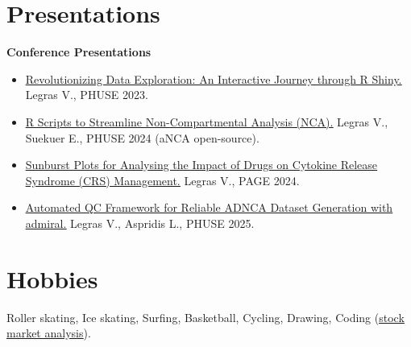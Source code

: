 \documentclass[10pt,a4paper]{article}
\newcommand{\link}[2]{\href{#1}{\textcolor{linkblue}{\uline{#2}}}}
\newcommand{\skillhead}[1]{\vspace{3pt}\noindent\textbf{\color{accent}#1}\par\vspace{1pt}}
\begin{document}
\section{Presentations}
{\sloppy
\skillhead{Conference Presentations}
\begin{itemize}
  \item \link{https://phuse.s3.eu-central-1.amazonaws.com/Archive/2023/Connect/EU/Birmingham/PRE_DV02.pdf}{Revolutionizing
        Data Exploration: An Interactive Journey through R Shiny.} Legras V.,
        PHUSE 2023.
  \item \link{https://phuse.s3.eu-central-1.amazonaws.com/Archive/2024/Connect/EU/Strasbourg/PRE_SM06.pdf}{R
        Scripts to Streamline Non-Compartmental Analysis (NCA).} Legras V.,
        Suekuer E., PHUSE 2024 (aNCA open-source).
  \item \link{https://www.page-meeting.org/wp-content/uploads/pdf_assets/11030-abstract.pdf}{Sunburst
        Plots for Analysing the Impact of Drugs on Cytokine Release Syndrome
        (CRS) Management.} Legras V., PAGE 2024.
  \item \link{https://phuse.s3.eu-central-1.amazonaws.com/Archive/2025/Connect/EU/Hamburg/PRE_SM05.pdf}{Automated
        QC Framework for Reliable ADNCA Dataset Generation with admiral.}
        Legras V., Aspridis L., PHUSE 2025.
\end{itemize}
\par}%

\section{Hobbies}
Roller skating, Ice skating, Surfing, Basketball, Cycling, Drawing,
Coding (\link{https://shaakon35.github.io/Stock_portfolio/}{stock market analysis}).
\end{document}
